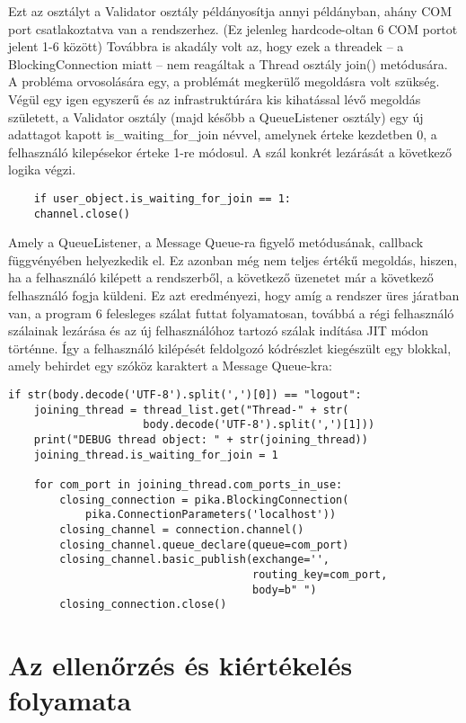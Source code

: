 \documentclass[12pt]{report}
\begin{document}
Ezt az osztályt a Validator osztály példányosítja annyi példányban, ahány COM port csatlakoztatva van a rendszerhez. (Ez jelenleg hardcode-oltan 6 COM portot jelent 1-6 között)
Továbbra is akadály volt az, hogy ezek a threadek -- a BlockingConnection miatt -- nem reagáltak a Thread osztály join() metódusára. A probléma orvosolására egy, a problémát megkerülő megoldásra volt szükség. Végül egy igen egyszerű és az infrastruktúrára kis kihatással lévő megoldás született, a Validator osztály (majd később a QueueListener osztály) egy új adattagot kapott is\_waiting\_for\_join névvel, amelynek érteke kezdetben 0, a felhasználó kilepésekor érteke 1-re módosul. A szál konkrét lezárását a következő logika végzi.

\begin{verbatim}
    if user_object.is_waiting_for_join == 1:
    channel.close()
\end{verbatim}

Amely a QueueListener, a Message Queue-ra figyelő metódusának, callback függvényében helyezkedik el. Ez azonban még nem teljes értékű megoldás, hiszen, ha a felhasználó kilépett a rendszerből, a következő üzenetet már a következő felhasználó fogja küldeni. Ez azt eredményezi, hogy amíg a rendszer üres járatban van, a program 6 felesleges szálat futtat folyamatosan, továbbá a régi felhasználó szálainak lezárása és az új felhasználóhoz tartozó szálak indítása JIT módon történne. Így a felhasználó kilépését feldolgozó kódrészlet kiegészült egy blokkal, amely behirdet egy szóköz karaktert a Message Queue-kra:

\begin{verbatim}
if str(body.decode('UTF-8').split(',')[0]) == "logout":
    joining_thread = thread_list.get("Thread-" + str(
                     body.decode('UTF-8').split(',')[1]))
    print("DEBUG thread object: " + str(joining_thread))
    joining_thread.is_waiting_for_join = 1

    for com_port in joining_thread.com_ports_in_use:
        closing_connection = pika.BlockingConnection(
            pika.ConnectionParameters('localhost'))
        closing_channel = connection.channel()
        closing_channel.queue_declare(queue=com_port)
        closing_channel.basic_publish(exchange='',
                                      routing_key=com_port,
                                      body=b" ")
        closing_connection.close()
\end{verbatim}

\section{Az ellenőrzés és kiértékelés folyamata}
\end{document}
